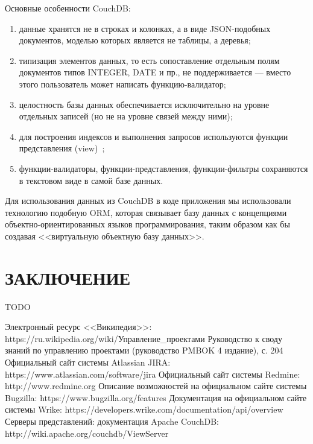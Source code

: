\documentclass[14pt, a4paper]{extreport}
\begin{document}
Основные особенности CouchDB:
\begin{enumerate}
\item данные хранятся не в строках и колонках, а в виде JSON-подобных документов,
  моделью которых является не таблицы, а деревья;
\item типизация элементов данных, то есть сопоставление отдельным полям документов типов INTEGER, DATE и пр.,
  не поддерживается — вместо этого пользователь может написать функцию-валидатор;
\item целостность базы данных обеспечивается исключительно на уровне отдельных записей
  (но не на уровне связей между ними);
\item для построения индексов и выполнения запросов используются функции представления (view)~\cite{couchdb_doc};
\item функции-валидаторы, функции-представления, функции-фильтры сохраняются в текстовом виде в самой базе данных.
\end{enumerate}

Для использования данных из CouchDB в коде приложения мы использовали технологию подобную ORM,
которая связывает базу данных с концепциями объектно-ориентированных языков программирования,
таким образом как бы создавая <<виртуальную объектную базу данных>>.

\chapter{\MakeTextUppercase{Заключение}}
TODO

\newpage
\clearpage
%
\begin{thebibliography}{}
 Электронный ресурс <<Википедия>>: \\https://ru.wikipedia.org/wiki/Управление\_проектами
 Руководство к своду знаний по управлению проектами (руководство PMBOK 4 издание), с. 204
 Официальный сайт системы Atlassian JIRA: https://www.atlassian.com/software/jira
 Официальный сайт системы Redmine: http://www.redmine.org
 Описание возможностей на официальном сайте системы Bugzilla: https://www.bugzilla.org/features
 Документация на официальном сайте системы Wrike: https://developers.wrike.com/documentation/api/overview
 Серверы представлений: документация Apache CouchDB: http://wiki.apache.org/couchdb/ViewServer
\end{thebibliography}
\end{document}
